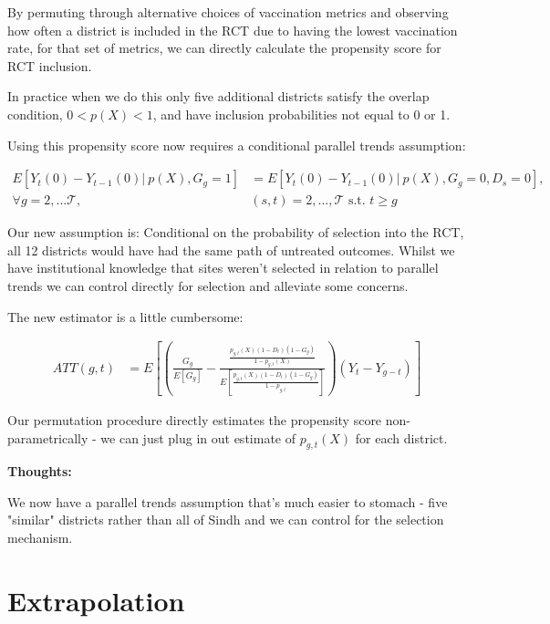 \documentclass{article}
\begin{document}
   By permuting through alternative choices of vaccination metrics and observing 
   how often a district is included in the RCT due to having the lowest vaccination 
   rate, for that set of metrics, we can directly calculate the propensity 
   score for RCT inclusion.
   
   In practice when we do this only five additional districts satisfy the overlap 
   condition, $0 < p(X) < 1$, and have inclusion probabilities not equal to 0 or 1. 

   Using this propensity score now requires a conditional parallel trends assumption:

   


\begin{align*}
   E\left[Y_t(0) - Y_{t-1}(0) |\  p(X), G_g = 1\right] &= 
   E\left[
      Y_t(0) - Y_{t-1}(0) |\  p(X), G_g  = 0 , D_s = 0
   \right],  \\ \forall g = 2, ... \mathcal{T}, & (s,t) = 2, ..., \mathcal{T} \text{ s.t. } t \geq g
\end{align*}


Our new assumption is: Conditional on the probability of selection into the RCT, 
all 12 districts would have had the same path of untreated outcomes. Whilst 
we have institutional knowledge that sites weren't selected in relation to 
parallel trends we can control directly for selection and alleviate some concerns. 

The new estimator is a little cumbersome:

\begin{align*}
  ATT(g,t) &= E\left[
     \left(
   \frac{G_g}{E[G_g]} -
   \frac{\frac{
      p_{g,t}(X)(1 - D_t)(1 - G_g)
   }{
      1 - p_{g,t}(X)
   }}{
  E\left[    \frac{
   p_{g,t}(X)(1 - D_t)(1 - G_g)
      }{1 - p_{g,t}}
   \right]
      }
     \right)
     (Y_t - Y_{g-t})
  \right] 
\end{align*}


Our permutation procedure directly estimates the propensity score non-parametrically -
we can just plug in out estimate of $p_{g,t}(X)$ for each district.

\textbf{Thoughts:}


We now have a parallel trends assumption that's much easier to stomach - 
five "similar" districts rather than all of Sindh and we can control  
for the selection mechanism.


\section{Extrapolation}
\end{document}
